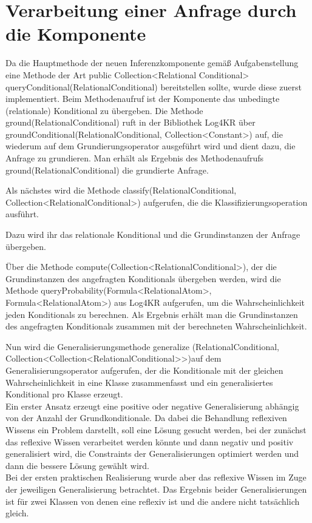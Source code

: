 \documentclass[a4paper, 11pt]{book}
\begin{document}
\section{Verarbeitung einer Anfrage durch die Komponente}
Da die Hauptmethode der neuen Inferenzkomponente gemäß Aufgabenstellung eine Methode der Art public Collection<Relational Conditional> queryConditional(RelationalConditional) bereitstellen sollte, wurde diese zuerst  implementiert. Beim Methodenaufruf ist der Komponente das unbedingte (relationale) Konditional zu übergeben.
Die Methode ground(RelationalConditional) ruft in der Bibliothek Log4KR über groundConditional(RelationalConditional, Collection<Constant>) auf, die wiederum auf dem Grundierungsoperator ausgeführt wird und dient dazu, die Anfrage zu grundieren. Man erhält als Ergebnis des Methodenaufrufs ground(RelationalConditional) die grundierte Anfrage.

Als nächstes wird die Methode classify(RelationalConditional, Collection<RelationalConditional>) aufgerufen, die die Klassifizierungsoperation ausführt.

Dazu wird ihr das relationale Konditional und die Grundinstanzen der Anfrage übergeben.

Über die Methode compute(Collection<RelationalConditional>), der die Grundinstanzen des angefragten Konditionals übergeben werden, wird die Methode queryProbability(Formula<RelationalAtom>, Formula<RelationalAtom>) aus Log4KR aufgerufen, um die Wahrscheinlichkeit jeden Konditionals zu berechnen. Als Ergebnis erhält man die Grundinstanzen des angefragten Konditionals zusammen mit der berechneten Wahrscheinlichkeit.

Nun wird die Generalisierungsmethode generalize (RelationalConditional, Collection<Collection<RelationalConditional>>)auf dem  Generalisierungsoperator aufgerufen, der die Konditionale mit der gleichen Wahrscheinlichkeit in eine Klasse zusammenfasst und ein generalisiertes Konditional pro Klasse erzeugt.\\
Ein erster Ansatz erzeugt eine positive oder negative Generalisierung abhängig von der Anzahl der Grundkonditionale. Da dabei die Behandlung reflexiven Wissens ein Problem darstellt, soll eine Lösung gesucht werden, bei der zunächst das reflexive Wissen verarbeitet werden könnte und dann negativ und positiv generalisiert wird, die Constraints der Generalisierungen optimiert werden und dann die bessere Lösung gewählt wird. \\
Bei der ersten praktischen Realisierung wurde aber das reflexive Wissen im Zuge der jeweiligen Generalisierung betrachtet. Das Ergebnis beider Generalisierungen ist für zwei Klassen von denen eine reflexiv ist und die andere nicht tatsächlich gleich.\\
\end{document}
